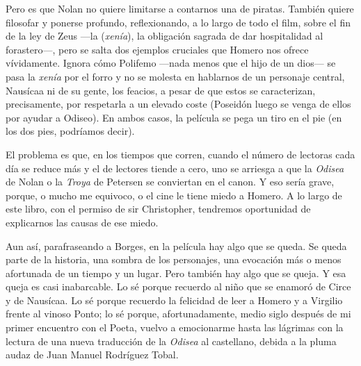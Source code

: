 Pero es que Nolan no quiere limitarse a contarnos una de piratas. También quiere filosofar y ponerse profundo, reflexionando, a lo largo de todo el film, sobre el fin de la ley de Zeus ---la  (\emph{xenía}), la obligación sagrada de dar hospitalidad al forastero---, pero se salta dos ejemplos cruciales que Homero nos ofrece vívidamente. Ignora cómo Polifemo ---nada menos que el hijo de un dios--- se pasa la \emph{xenía} por el forro y no se molesta en hablarnos de un personaje central, Nausícaa ni de su gente, los feacios, a pesar de que estos se caracterizan, precisamente, por respetarla a un elevado coste (Poseidón luego se venga de ellos por ayudar a Odiseo). En ambos casos, la película se pega un tiro en el pie (en los dos pies, podríamos decir).

El problema es que, en los tiempos que corren, cuando el número de lectoras cada día se reduce más y el de lectores tiende a cero, uno se arriesga a que la \emph{Odisea} de Nolan o la \emph{Troya} de Petersen se conviertan en el canon. Y eso sería grave, porque, o mucho me equivoco, o el cine le tiene miedo a Homero. A lo largo de este libro, con el permiso de sir Christopher, tendremos oportunidad de explicarnos las causas de ese miedo.

Aun así, parafraseando a Borges, en la película hay algo que se queda. Se queda parte de la historia, una sombra de los personajes, una evocación más o menos afortunada de un tiempo y un lugar. Pero también hay algo que se queja. Y esa queja es casi inabarcable. Lo sé porque recuerdo al niño que se enamoró de Circe y de Nausícaa. Lo sé porque recuerdo la felicidad de leer a Homero y a Virgilio frente al vinoso Ponto; lo sé porque, afortunadamente, medio siglo después de mi primer encuentro con el Poeta, vuelvo a emocionarme hasta las lágrimas con la lectura de una nueva traducción de la \emph{Odisea} al castellano, debida a la pluma audaz de Juan Manuel Rodríguez Tobal.


